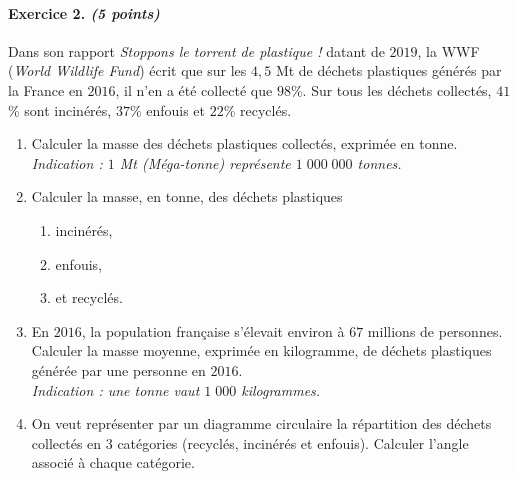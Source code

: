 \documentclass[11pt]{article}
\begin{document}
\paragraph{Exercice 2. \emph{(5 points)}} Dans son rapport \emph{Stoppons le torrent de plastique
!} datant de $2019$, la WWF (\emph{World Wildlife Fund}) écrit que sur les $4,5$
Mt de déchets plastiques générés par la France en $2016$, il n'en a été
collecté que $98$\%. Sur tous les déchets collectés, $41$\% sont incinérés,
$37$\% enfouis et $22$\% recyclés.
\begin{enumerate}
  \item Calculer la masse des déchets plastiques collectés, exprimée en tonne.\\
    \emph{Indication : $1$ Mt (Méga-tonne) représente $1\;000\;000$ tonnes.}
  \item Calculer la masse, en tonne, des déchets plastiques
    \begin{enumerate}
      \item incinérés,
      \item enfouis,
      \item et recyclés.
    \end{enumerate}
  \item En $2016$, la population française s'élevait environ à $67$ millions de
    personnes. Calculer la masse moyenne, exprimée en kilogramme, de déchets
    plastiques générée par une personne en $2016$.\\
    \emph{Indication : une tonne vaut $1\;000$ kilogrammes.}
  \item On veut représenter par un diagramme circulaire la répartition des
    déchets collectés en $3$ catégories (recyclés, incinérés et enfouis).
    Calculer l'angle associé à chaque catégorie.
\end{enumerate}
\end{document}
